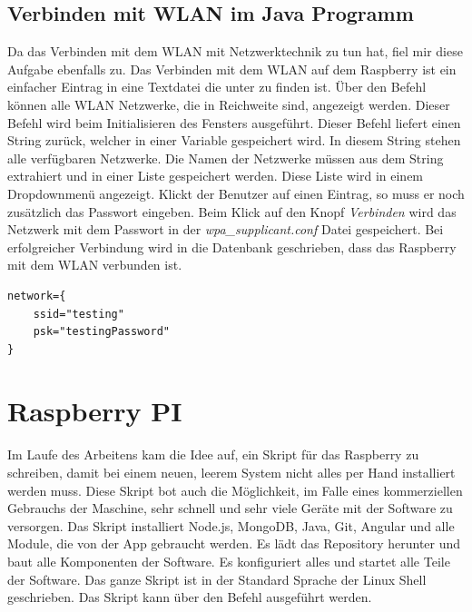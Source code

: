 \subsection{Verbinden mit WLAN im Java Programm}
\label{sec:ums-wlan}
Da das Verbinden mit dem \ac{WLAN} mit Netzwerktechnik zu tun hat, fiel mir diese Aufgabe ebenfalls zu. Das Verbinden mit dem \ac{WLAN} auf dem Raspberry ist ein einfacher Eintrag in eine Textdatei die unter  zu finden ist. Über den Befehl  können alle \ac{WLAN} Netzwerke, die in Reichweite sind, angezeigt werden. Dieser Befehl wird beim Initialisieren des Fensters ausgeführt. Dieser Befehl liefert einen String zurück, welcher in einer Variable gespeichert wird. In diesem String stehen alle verfügbaren Netzwerke. Die Namen der Netzwerke müssen aus dem String extrahiert und in einer Liste gespeichert werden. Diese Liste wird in einem Dropdownmenü angezeigt. Klickt der Benutzer auf einen Eintrag, so muss er noch zusätzlich das Passwort eingeben. Beim Klick auf den Knopf \textit{Verbinden} wird das Netzwerk mit dem Passwort in der \textit{wpa\_supplicant.conf} Datei gespeichert. Bei erfolgreicher Verbindung wird in die Datenbank geschrieben, dass das Raspberry mit dem \ac{WLAN} verbunden ist.

\begin{lstlisting}[caption=WLAN Konfigurationsbeispiel,label=wlan-datei-beispiel,style=bash]
network={
    ssid="testing"
    psk="testingPassword"
}
\end{lstlisting}

\section{Raspberry PI}
\label{sec:raspi}
Im Laufe des Arbeitens kam die Idee auf, ein Skript für das Raspberry zu schreiben, damit bei einem neuen, leerem System nicht alles per Hand installiert werden muss. Diese Skript bot auch die Möglichkeit, im Falle eines kommerziellen Gebrauchs der Maschine, sehr schnell und sehr viele Geräte mit der Software zu versorgen. Das Skript installiert Node.js, MongoDB, Java, Git, Angular und alle Module, die von der App gebraucht werden. Es lädt das Repository herunter und baut alle Komponenten der Software. Es konfiguriert alles und startet alle Teile der Software. Das ganze Skript ist in der Standard Sprache der Linux Shell geschrieben. Das Skript kann über den Befehl  ausgeführt werden.

